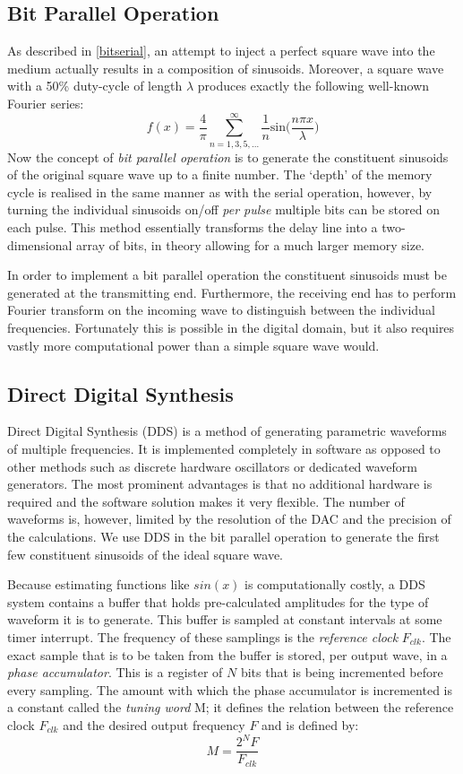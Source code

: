 \documentclass[10pt,a4paper,twocolumn]{article}
\begin{document}
\subsection{Bit Parallel Operation}
As described in \ref{bitserial}, an attempt to inject a perfect square wave into the medium actually results in a composition of sinusoids. Moreover, a square wave with a 50\% duty-cycle of length $\lambda$ produces exactly the following well-known Fourier series:
$$
f(x) = \frac{4}{\pi} \sum^{\infty}_{n=1,3,5,\dots} \frac{1}{n} \mathrm{sin} \Big ( \frac{n \pi x}{\lambda} \Big )
$$
Now the concept of \emph{bit parallel operation} is to generate the constituent sinusoids of the original square wave up to a finite number. The `depth' of the memory cycle is realised in the same manner as with the serial operation, however, by turning the individual sinusoids on/off \emph{per pulse} multiple bits can be stored on each pulse. This method essentially transforms the delay line into a two-dimensional array of bits, in theory allowing for a much larger memory size.

In order to implement a bit parallel operation the constituent sinusoids must be generated at the transmitting end. Furthermore, the receiving end has to perform Fourier transform on the incoming wave to distinguish between the individual frequencies. Fortunately this is possible in the digital domain, but it also requires vastly more computational power than a simple square wave would.

\subsection{Direct Digital Synthesis}\label{dds}
Direct Digital Synthesis (DDS)\cite{dds} is a method of generating parametric waveforms of multiple frequencies. It is implemented completely in software as opposed to other methods such as discrete hardware oscillators or dedicated waveform generators. The most prominent advantages is that no additional hardware is required and the software solution makes it very flexible. The number of waveforms is, however, limited by the resolution of the DAC and the precision of the calculations. We use DDS in the bit parallel operation to generate the first few constituent sinusoids of the ideal square wave.

Because estimating functions like $sin(x)$ is computationally costly, a DDS system contains a buffer that holds pre-calculated amplitudes for the type of waveform it is to generate. This buffer is sampled at constant intervals at some timer interrupt. The frequency of these samplings is the \emph{reference clock} $F_{clk}$. The exact sample that is to be taken from the buffer is stored, per output wave, in a \emph{phase accumulator}. This is a register of $N$ bits that is being incremented before  every sampling. The amount with which the phase accumulator is incremented is a constant called the \emph{tuning word} M; it defines the relation between the reference clock $F_{clk}$ and the desired output frequency $F$ and is defined by:
$$
M = \frac{2^NF}{F_{clk}}
$$
\end{document}
